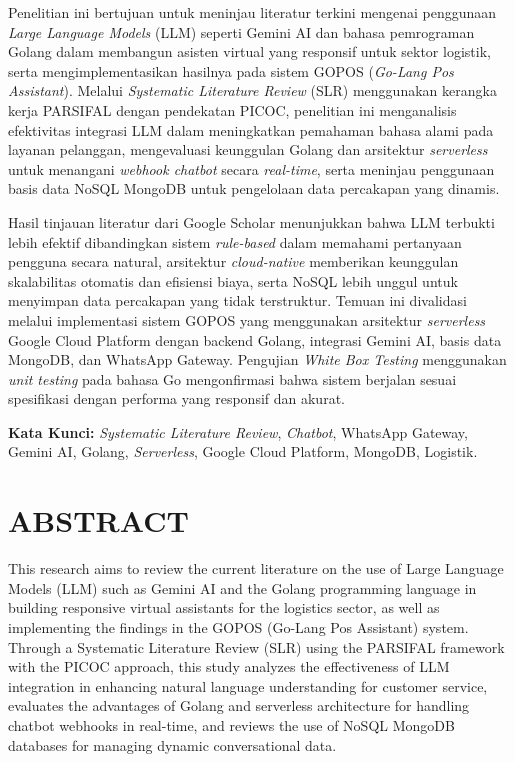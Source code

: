 \begin{summary}
Penelitian ini bertujuan untuk meninjau literatur terkini mengenai penggunaan \textit{Large Language Models} (LLM) seperti Gemini AI dan bahasa pemrograman Golang dalam membangun asisten virtual yang responsif untuk sektor logistik, serta mengimplementasikan hasilnya pada sistem GOPOS (\textit{Go-Lang Pos Assistant}). Melalui \textit{Systematic Literature Review} (SLR) menggunakan kerangka kerja PARSIFAL dengan pendekatan PICOC, penelitian ini menganalisis efektivitas integrasi LLM dalam meningkatkan pemahaman bahasa alami pada layanan pelanggan, mengevaluasi keunggulan Golang dan arsitektur \textit{serverless} untuk menangani \textit{webhook chatbot} secara \textit{real-time}, serta meninjau penggunaan basis data NoSQL MongoDB untuk pengelolaan data percakapan yang dinamis.

Hasil tinjauan literatur dari Google Scholar menunjukkan bahwa LLM terbukti lebih efektif dibandingkan sistem \textit{rule-based} dalam memahami pertanyaan pengguna secara natural, arsitektur \textit{cloud-native} memberikan keunggulan skalabilitas otomatis dan efisiensi biaya, serta NoSQL lebih unggul untuk menyimpan data percakapan yang tidak terstruktur. Temuan ini divalidasi melalui implementasi sistem GOPOS yang menggunakan arsitektur \textit{serverless} Google Cloud Platform dengan backend Golang, integrasi Gemini AI, basis data MongoDB, dan WhatsApp Gateway. Pengujian \textit{White Box Testing} menggunakan \textit{unit testing} pada bahasa Go mengonfirmasi bahwa sistem berjalan sesuai spesifikasi dengan performa yang responsif dan akurat.

\textbf{Kata Kunci:} \textit{Systematic Literature Review}, \textit{Chatbot}, WhatsApp Gateway, Gemini AI, Golang, \textit{Serverless}, Google Cloud Platform, MongoDB, Logistik.
\end{summary}

\clearpage

\section*{ABSTRACT}
{}

This research aims to review the current literature on the use of Large Language Models (LLM) such as Gemini AI and the Golang programming language in building responsive virtual assistants for the logistics sector, as well as implementing the findings in the GOPOS (Go-Lang Pos Assistant) system. Through a Systematic Literature Review (SLR) using the PARSIFAL framework with the PICOC approach, this study analyzes the effectiveness of LLM integration in enhancing natural language understanding for customer service, evaluates the advantages of Golang and serverless architecture for handling chatbot webhooks in real-time, and reviews the use of NoSQL MongoDB databases for managing dynamic conversational data.

